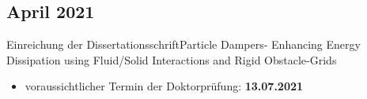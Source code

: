 \documentclass{mycv}
\begin{document}
\begin{paracol}{2}
		
\subsection{April 2021}{Einreichung der Dissertationsschrift}{Particle Dampers-
Enhancing Energy Dissipation using Fluid/Solid Interactions and Rigid
Obstacle-Grids}
	  \begin{itemize}
			\item voraussichtlicher Termin der Doktorpr{\"u}fung:
				{\bfseries 13.07.2021}
		\end{itemize}
\end{paracol}

{\rlap{\color{templateColor1}\rule[0mm]{\textwidth}{\ulinewidth}}}
\end{document}
